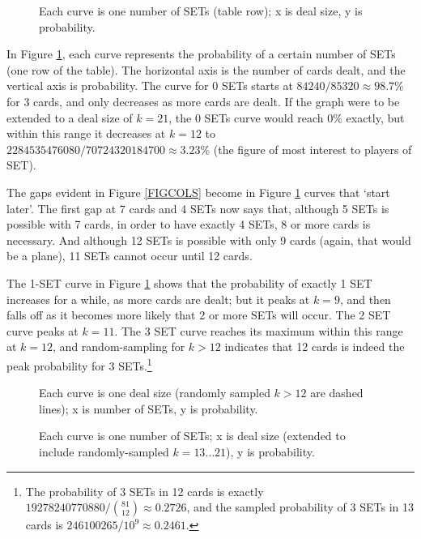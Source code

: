 \documentclass[10pt]{amsart}
\newcommand{\SET}{SET\texttrademark}  %
\begin{document}
\begin{figure}[!htb]
  \caption{\label{FIGROWS} Each curve is one number of SETs (table row); x is
    deal size, y is probability.}
\end{figure}

In Figure \ref{FIGROWS}, each curve represents the probability of a certain
number of SETs (one row of the table). The horizontal axis is the number of
cards dealt, and the vertical axis is probability. The curve for 0 SETs starts
at $84240/85320\approx 98.7\%$ for 3 cards, and only decreases as more cards are
dealt. If the graph were to be extended to a deal size of $k=21$, the 0 SETs
curve would reach $0\%$ exactly, but within this range it decreases at $k=12$ to
$2284535476080/70724320184700\approx 3.23\%$ (the figure of most interest to
players of \SET).

The gaps evident in Figure \ref{FIGCOLS} become in Figure \ref{FIGROWS} curves
that `start later'. The first gap at 7 cards and 4 SETs now says that, although
5 SETs is possible with 7 cards, in order to have exactly 4 SETs, 8 or more
cards is necessary. And although 12 SETs is possible with only 9 cards (again,
that would be a plane), 11 SETs cannot occur until 12 cards.

The 1-SET curve in Figure \ref{FIGROWS} shows that the probability of exactly 1
SET increases for a while, as more cards are dealt; but it peaks at $k=9$, and
then falls off as it becomes more likely that 2 or more SETs will occur. The 2
SET curve peaks at $k=11$. The 3 SET curve reaches its maximum within this range
at $k=12$, and random-sampling for $k>12$ indicates that 12 cards is indeed the
peak probability for 3 SETs.\footnote{The probability of 3 SETs in 12 cards is
  exactly $19278240770880/\binom{81}{12}\approx 0.2726$, and the sampled
  probability of 3 SETs in 13 cards is $246100265/10^9\approx 0.2461$.}

\begin{figure}[!htb]
  \caption{\label{FIGCOLSFULL} Each curve is one deal size (randomly sampled $k>12$
    are dashed lines); x is number of SETs, y is probability.}
\end{figure}

\begin{figure}[!htb]
  \caption{\label{FIGROWSFULL} Each curve is one number of SETs; x is deal size
    (extended to include randomly-sampled $k=13\ldots 21$), y is probability.}
\end{figure}
\end{document}

